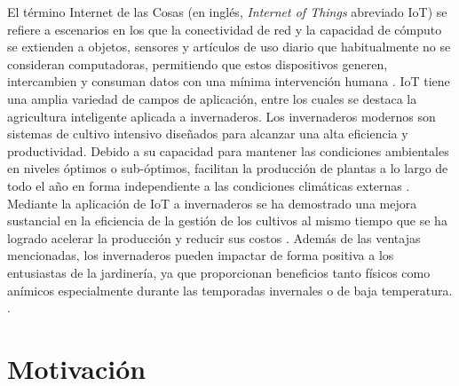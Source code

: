El término Internet de las Cosas (en inglés, \textit{Internet of Things} abreviado IoT) se refiere a escenarios en los que la conectividad de red y la capacidad de cómputo se extienden a objetos, sensores y artículos de uso diario que habitualmente no se consideran computadoras, permitiendo que estos dispositivos generen, intercambien y consuman datos con una mínima intervención humana \citep{iotOverview}.
IoT tiene una amplia variedad de campos de aplicación, entre los cuales se destaca la agricultura inteligente aplicada a invernaderos.
Los invernaderos modernos son sistemas de cultivo intensivo diseñados para alcanzar una alta eficiencia y productividad. Debido a su capacidad para mantener las condiciones ambientales en niveles óptimos o sub-óptimos, facilitan la producción de plantas a lo largo de todo el año en forma independiente a las condiciones climáticas externas \citep{HistoryofControlledEnvironmentHorticultureGreenhouses}.
Mediante la aplicación de IoT a invernaderos se ha demostrado una mejora sustancial en la eficiencia de la gestión de los cultivos al mismo tiempo que se ha logrado acelerar la producción y reducir sus costos \citep{IoTparaInvernaderos}.
Además de las ventajas mencionadas, los invernaderos pueden impactar de forma positiva a los entusiastas de la jardinería, ya que proporcionan beneficios tanto físicos como anímicos especialmente durante las temporadas invernales o de baja temperatura. \citep{GreenHousesForHomeOwnersAndGardeners}. \\


\section{Motivación}
\label{Motivación}

